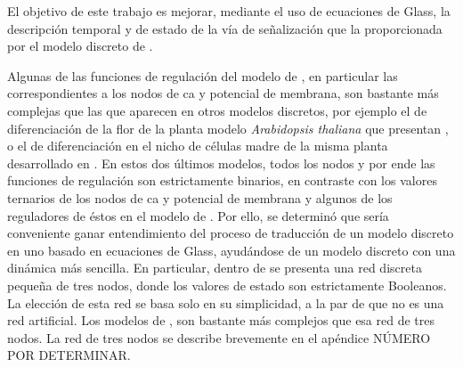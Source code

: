 El objetivo de este trabajo es mejorar, mediante el uso de ecuaciones de Glass, la descripción temporal y de estado de la vía de señalización que la proporcionada por el modelo discreto de \citeauthor{Espinal2011} \citep{Espinal2011}. 

Algunas de las funciones de regulación del modelo de \citeauthor{Espinal2011} \citep{Espinal2011}, en particular las correspondientes a los nodos de \ac{ca} y potencial de membrana, son bastante más complejas que las que aparecen en otros modelos discretos, por ejemplo el de diferenciación de la flor de la planta modelo  \emph{Arabidopsis thaliana} que presentan \citeauthor{EspinosaSoto:2004jr} \citep{EspinosaSoto:2004jr}, o el de diferenciación en el nicho de células madre de la misma planta desarrollado en \citeauthor{Azpeitia:2010ik} \citep{Azpeitia:2010ik}. En estos dos últimos modelos, todos los nodos y por ende las funciones de regulación son estrictamente binarios, en contraste con los valores ternarios de los nodos de \ac{ca} y potencial de membrana y algunos de los reguladores de éstos en el modelo de \citeauthor{Espinal2011}. Por ello, se determinó que sería conveniente ganar entendimiento del proceso de traducción de un modelo discreto en uno basado en ecuaciones de Glass, ayudándose de un modelo discreto con una dinámica más sencilla. En particular, dentro de  \citeauthor{Reka3Nodos2010} \citep{Reka3Nodos2010} se presenta una red discreta pequeña de tres nodos, donde los valores de estado son estrictamente Booleanos. La elección de esta red se basa solo en su simplicidad, a la par de que no es una red artificial. Los  modelos de \citeauthor{EspinosaSoto:2004jr} \citep{EspinosaSoto:2004jr}, \citeauthor{Azpeitia:2010ik} \citep{Azpeitia:2010ik} son bastante más complejos que esa red de tres nodos. La red de tres nodos se describe brevemente en el apéndice NÚMERO POR DETERMINAR.

